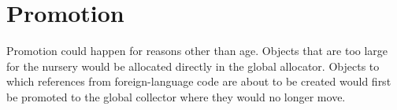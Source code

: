 \section{Promotion}

Promotion could happen for reasons other than age.  Objects that are
too large for the nursery would be allocated directly in the global
allocator.  Objects to which references from foreign-language code are
about to be created would first be promoted to the global collector
where they would no longer move.


